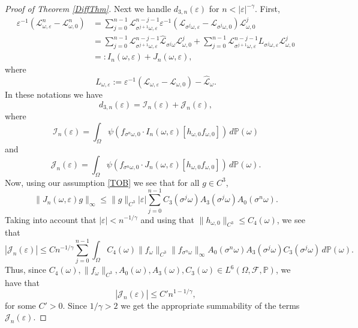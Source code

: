 \documentclass[11pt,reqno,a4paper]{article}
\theoremstyle{special}
\def\om{\omega}
\begin{document}
\begin{proof}[Proof of Theorem \ref{DiffThm}]
Next we handle $d_{3,n}(\varepsilon)$ for $n< |\varepsilon|^{-\gamma}$. First,
\[
\begin{split}
\varepsilon^{-1}(\mathcal L_{\om, \varepsilon}^n-\mathcal L_{\omega, 0}^n)
&=\sum_{j=0}^{n-1}
\mathcal L_{\sigma^{j+1}\om, \varepsilon}^{n-j-1}\varepsilon^{-1}(\mathcal L_{\sigma^j\om, \varepsilon}-\mathcal L_{\sigma^j\om, 0})\mathcal L_{\om, 0}^{j} \\
&=\sum_{j=0}^{n-1}\mathcal L_{\sigma^{j+1}\om, \varepsilon}^{n-j-1}\hat{\mathcal L}_{\sigma^j\om}\mathcal L_{\om, 0}^{j}+\sum_{j=0}^{n-1}\mathcal L_{\sigma^{j+1}\om, \varepsilon}^{n-j-1} L_{\sigma^j\om,\varepsilon}\mathcal L_{\om, 0}^{j}\\
&=:I_n(\om, \varepsilon)+J_n(\om, \varepsilon),
\end{split}
\]
where 
$$
L_{\om,\varepsilon}:=\varepsilon^{-1}(\mathcal L_{\om, \varepsilon}-\mathcal L_{\om, 0})-\hat{\mathcal L}_\om. 
$$
In these notations we have
$$
d_{3,n}(\varepsilon)=\mathcal I_n(\varepsilon)+\mathcal J_n(\varepsilon),
$$
where 
$$
\mathcal I_n(\varepsilon)=\int_\Omega \psi(f_{\sigma^n\om, 0}\cdot I_n(\om, \varepsilon)[h_{\om, 0}f_{\om, 0}]) \,d\mathbb P(\om)
$$
and 
$$
\mathcal J_n(\varepsilon)=\int_\Omega \psi(f_{\sigma^n\om, 0}\cdot J_n(\om, \varepsilon)[h_{\om, 0}f_{\om, 0}]) \, d\mathbb P(\om).
$$
Now, using our assumption \eqref{TOB} 
we see that for all $g\in C^3$,
$$
\|J_n(\om, \varepsilon)g\|_{\infty}\leq \|g\|_{C^3}|\varepsilon|\sum_{j=0}^{n-1}C_3(\sigma^j\om)A_3(\sigma^j\om)A_0(\sigma^{n}\om).
$$
Taking into account that $|\varepsilon|<n^{-1/\gamma}$ and using that $\|h_{\om, 0}\|_{C^3}\leq C_4(\om)$, we see that
$$
|\mathcal J_n(\varepsilon)|\leq Cn^{-1/\gamma}\sum_{j=0}^{n-1}\int_\Omega C_4(\om)\|f_{\om}\|_{C^3}\|f_{\sigma^n\om}\|_\infty A_0(\sigma^n\om)A_3(\sigma^j\om)C_3(\sigma^j\om) \, d\mathbb P(\om).
$$
Thus, since  $C_4(\om), \|f_\om\|_{C^3}, A_0(\om),A_3(\om), C_3(\om)\in L^{6}(\Omega,\mathcal F,\mathbb P)$, we have that 
$$
|\mathcal J_n(\varepsilon)|\leq C'n^{1-1/\gamma},
$$
for some $C'>0$.
Since $1/\gamma>2$ we get the appropriate summability of the terms $\mathcal J_n(\varepsilon)$.


\end{proof}
\end{document}
